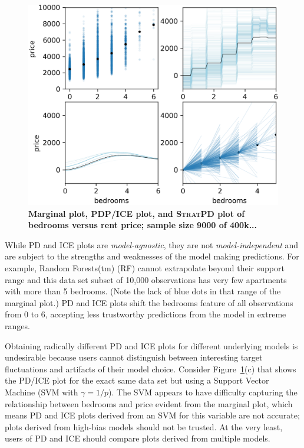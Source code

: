 \documentclass[12pt]{article}
\newcommand{\figref}[1]{Figure~\ref{#1}}
\newcommand{\cut}[1]{}
\newcommand{\spd}{\fontfamily{cmr}\textsc{\small StratPD}}
\begin{document}
\begin{figure}[htbp]
\begin{center}
\includegraphics[scale=0.7]{images/bedrooms_vs_price.png}
\caption{{\bf  Marginal plot, PDP/ICE plot, and \spd{} plot of bedrooms versus rent price; sample size 9000 of 400k...}}
\label{fig:baths_price}
\end{center}
\end{figure}

\cut{The partial dependence plot broadly follows the marginal plot except for the prices of two and three bedrooms apartments, where it levels off. This is counterintuitive and exposes an issue with PD and ICE plots.} While PD and ICE plots are {\em model-agnostic}, they are not {\em model-independent} and are subject to the strengths and weaknesses of the model making predictions.  For example, Random Forests(tm) (RF) cannot extrapolate beyond their support range and this data set subset of 10,000 observations has very few apartments with more than 5 bedrooms.  (Note the lack of blue dots in that range of the marginal plot.) PD and ICE plots shift the bedrooms feature of all observations from 0 to 6, accepting less trustworthy predictions from the model in extreme ranges.   

Obtaining radically different PD and ICE plots for different underlying models is undesirable because users cannot distinguish between interesting target fluctuations and artifacts of their model choice. Consider \figref{fig:baths_price}(c) that shows the PD/ICE plot for the exact same data set but using a Support Vector Machine (SVM with $\gamma=1/p$). The SVM appears to have difficulty capturing the relationship between bedrooms and price evident from the marginal plot, which means PD and ICE plots derived from an SVM for this variable are not accurate; plots derived from high-bias models should not be trusted. At the very least, users of PD and ICE should compare plots derived from multiple models. 
\end{document}
